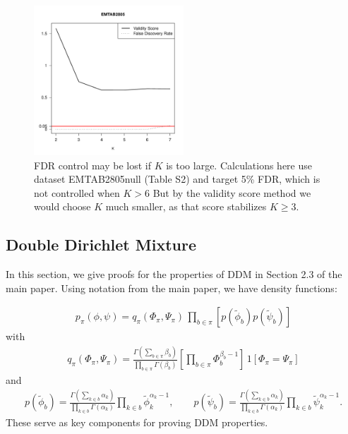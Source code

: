 \documentclass[aoas,preprint]{imsart}
\begin{document}
\begin{figure}[h]
\includegraphics[width = 0.5\textwidth]{Figs/breakFDR.pdf}
 \caption{FDR control may be lost if $K$ is too large.  Calculations here 
 use dataset EMTAB2805null (Table S2) and target 5\% FDR, which is not controlled when $K>6$
But by the validity score method we would choose $K$ much smaller, as that score stabilizes $K\geq3$. 
  \label{fig:lfdr}}
\end{figure}




\subsection{Double Dirichlet Mixture}

In this section, we give proofs for the properties of  DDM in Section 2.3 of the main paper.
Using notation from the main paper, we have density functions:

\begin{eqnarray*}
p_\pi(\phi,\psi) =
         q_\pi( \Phi_\pi, \Psi_\pi  ) \, \prod_{b \in \pi}  \left[
         p( \tilde \phi_b ) p( \tilde \psi_b ) \right]
\end{eqnarray*}
with
\begin{eqnarray*}
q_\pi( \Phi_\pi, \Psi_\pi  )
= \frac{\Gamma(\sum_{b\in \pi} \beta_b)}{
 \prod_{b \in \pi} \Gamma( \beta_b )} \left[\prod_{b \in \pi} \Phi_b^{\beta_b-1} \right] \,
 1\left[ \Phi_\pi = \Psi_\pi \right]
\end{eqnarray*}
and
\begin{eqnarray*}
p( \tilde \phi_b ) =
\frac{ \Gamma( \sum_{k\in b} \alpha_k ) }{ \prod_{k\in b} \Gamma(\alpha_k) }
 \prod_{k \in b} \tilde \phi_k^{\alpha_k -1 },
\qquad
p( \tilde \psi_b )
=
\frac{ \Gamma( \sum_{k\in b} \alpha_k ) }{ \prod_{k\in b} \Gamma(\alpha_k) }
\prod_{k \in b} \tilde \psi_k^{\alpha_k -1 }.
\end{eqnarray*}
These serve as key components for proving DDM properties.
\end{document}
